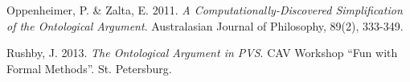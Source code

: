 \documentclass[smallextended]{svjour3}
\begin{document}
\begin{thebibliography}{9}
Oppenheimer, P. \& Zalta, E. 2011. {\itshape A Computationally-Discovered Simplification of the Ontological Argument}. Australasian Journal of Philosophy, 89(2), 333-349.

Rushby, J. 2013. {\itshape The Ontological Argument in PVS}. CAV Workshop ``Fun with Formal Methods''. St. Petersburg.










\end{thebibliography}
\end{document}
